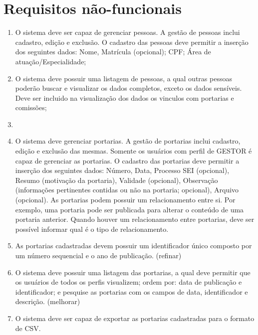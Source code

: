 \documentclass{scrreprt}
\begin{document}
\section{Requisitos não-funcionais}
\begin{enumerate}[label=\textbf{RF-\arabic*}]
\setcounter{RF}{1}
\item
O sistema deve ser capaz de gerenciar pessoas. A gestão de pessoas inclui cadastro, edição e exclusão. O cadastro das pessoas deve permitir a inserção dos seguintes dados: Nome, Matrícula (opcional); CPF; Área de atuação/Especialidade;

\item
O sistema deve possuir uma listagem de pessoas, a qual outras pessoas poderão  buscar e visualizar os dados completos, exceto os dados sensíveis. Deve ser incluido na visualização dos dados os vinculos com portarias e comissões;

\item

\item
O sistema deve gerenciar portarias. A gestão de portarias inclui cadastro, edição e exclusão das mesmas. Somente os usuários com perfil de GESTOR é capaz de gerenciar as portarias. O cadastro das portarias deve permitir a inserção dos seguintes dados: Número, Data, Processo SEI (opcional), Resumo (motivação da portaria), Validade (opcional), Observação (informações pertinentes contidas ou não na portaria; opcional), Arquivo (opcional). As portarias podem possuir um relacionamento entre si. Por exemplo, uma portaria pode ser publicada para alterar o conteúdo de uma portaria anterior. Quando houver um relacionamento entre portarias, deve ser possível informar qual é o tipo de relacionamento.

\item
As portarias cadastradas devem possuir um identificador único composto por um número sequencial e o ano de publicação. (refinar)

\item
O sistema deve possuir uma listagem das portarias, a qual deve permitir que os usuários de todos os perfis visualizem; ordem por:  data de publicação  e identificador; e pesquise as portarias com os campos de data, identificador e descrição. (melhorar)

\item
O sistema deve ser capaz de exportar as portarias cadastradas para o formato de CSV.
\end{enumerate}
\end{document}
